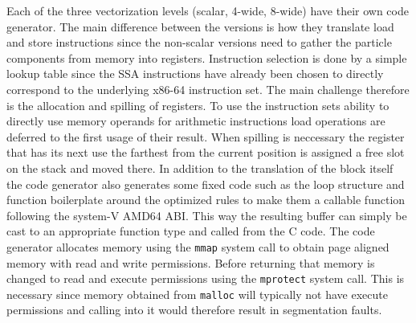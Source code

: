 Each of the three vectorization levels (scalar, 4-wide, 8-wide) have their own code generator. The main difference between the versions is how they translate load and store instructions since the non-scalar versions need to gather the particle components from memory into registers. Instruction selection is done by a simple lookup table since the SSA instructions have already been chosen to directly correspond to the underlying x86-64 instruction set. The main challenge therefore is the allocation and spilling of registers. To use the instruction sets ability to directly use memory operands for arithmetic instructions load operations are deferred to the first usage of their result. When spilling is neccessary the register that has its next use the farthest from the current position is assigned a free slot on the stack and moved there. In addition to the translation of the block itself the code generator also generates some fixed code such as the loop structure and function boilerplate around the optimized rules to make them a callable function following the system-V AMD64 ABI. This way the resulting buffer can simply be cast to an appropriate function type and called from the C code. The code generator allocates memory using the \texttt{mmap} system call to obtain page aligned memory with read and write permissions. Before returning that memory is changed to read and execute permissions using the \texttt{mprotect} system call. This is necessary since memory obtained from \texttt{malloc} will typically not have execute permissions and calling into it would therefore result in segmentation faults.
